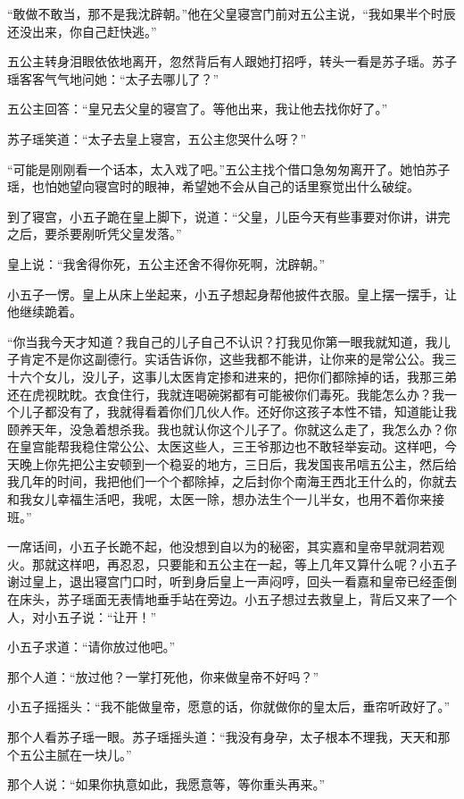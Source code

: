 “敢做不敢当，那不是我沈辟朝。”他在父皇寝宫门前对五公主说，“我如果半个时辰还没出来，你自己赶快逃。”

五公主转身泪眼依依地离开，忽然背后有人跟她打招呼，转头一看是苏子瑶。苏子瑶客客气气地问她：“太子去哪儿了？”

五公主回答：“皇兄去父皇的寝宫了。等他出来，我让他去找你好了。”

苏子瑶笑道：“太子去皇上寝宫，五公主您哭什么呀？”

“可能是刚刚看一个话本，太入戏了吧。”五公主找个借口急匆匆离开了。她怕苏子瑶，也怕她望向寝宫时的眼神，希望她不会从自己的话里察觉出什么破绽。
\newline

到了寝宫，小五子跪在皇上脚下，说道：“父皇，儿臣今天有些事要对你讲，讲完之后，要杀要剐听凭父皇发落。”

皇上说：“我舍得你死，五公主还舍不得你死啊，沈辟朝。”

小五子一愣。皇上从床上坐起来，小五子想起身帮他披件衣服。皇上摆一摆手，让他继续跪着。

“你当我今天才知道？我自己的儿子自己不认识？打我见你第一眼我就知道，我儿子肯定不是你这副德行。实话告诉你，这些我都不能讲，让你来的是常公公。我三十六个女儿，没儿子，这事儿太医肯定掺和进来的，把你们都除掉的话，我那三弟还在虎视眈眈。衣食住行，我就连喝碗粥都有可能被你们毒死。我能怎么办？我一个儿子都没有了，我就得看着你们几伙人作。还好你这孩子本性不错，知道能让我颐养天年，没急着想杀我。我也就认你这个儿子了。你就这么走了，我怎么办？你在皇宫能帮我稳住常公公、太医这些人，三王爷那边也不敢轻举妄动。这样吧，今天晚上你先把公主安顿到一个稳妥的地方，三日后，我发国丧吊唁五公主，然后给我几年的时间，我把他们一个个都除掉，之后封你个南海王西北王什么的，你就去和我女儿幸福生活吧，我呢，太医一除，想办法生个一儿半女，也用不着你来接班。”

一席话间，小五子长跪不起，他没想到自以为的秘密，其实嘉和皇帝早就洞若观火。那就这样吧，再忍忍，只要能和五公主在一起，等上几年又算什么呢？小五子谢过皇上，退出寝宫门口时，听到身后皇上一声闷哼，回头一看嘉和皇帝已经歪倒在床头，苏子瑶面无表情地垂手站在旁边。小五子想过去救皇上，背后又来了一个人，对小五子说：“让开！”

小五子求道：“请你放过他吧。”

那个人道：“放过他？一掌打死他，你来做皇帝不好吗？”

小五子摇摇头：“我不能做皇帝，愿意的话，你就做你的皇太后，垂帘听政好了。”

那个人看苏子瑶一眼。苏子瑶摇头道：“我没有身孕，太子根本不理我，天天和那个五公主腻在一块儿。”

那个人说：“如果你执意如此，我愿意等，等你重头再来。”

